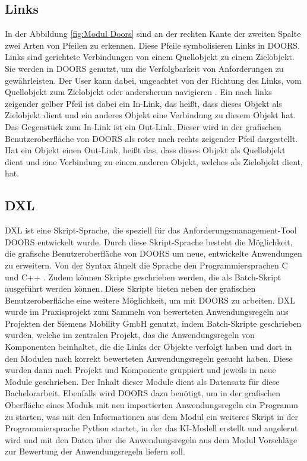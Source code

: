 \subsection{Links}
In der Abbildung \ref*{fig:Modul Doors} sind an der rechten Kante der zweiten Spalte zwei Arten von Pfeilen zu erkennen. Diese Pfeile
symbolisieren Links in \ac{DOORS}. Links sind gerichtete Verbindungen von einem Quellobjekt zu einem Zielobjekt. Sie werden in \ac{DOORS} 
genutzt, um die Verfolgbarkeit von Anforderungen zu gewährleisten. Der User kann 
dabei, ungeachtet von der Richtung des Links, vom Quellobjekt zum Zielobjekt oder andersherum navigieren \cite[vgl. S.183]{DOORS}. 
Ein nach links zeigender gelber Pfeil ist dabei ein In-Link, das heißt, dass dieses Objekt als Zielobjekt dient und ein anderes Objekt 
eine Verbindung zu diesem Objekt hat. Das Gegenstück zum In-Link ist ein Out-Link. Dieser wird in der grafischen Benutzeroberfläche von 
\ac{DOORS} als roter nach rechts zeigender Pfeil dargestellt. Hat ein Objekt einen Out-Link, heißt das, dass dieses Objekt als Quellobjekt 
dient und eine Verbindung zu einem anderen Objekt, welches als Zielobjekt dient, hat.   

\subsection{DXL}

\ac{DXL} ist eine Skript-Sprache, die speziell für das Anforderungsmanagement-Tool \ac{DOORS} entwickelt wurde. Durch diese Skript-Sprache
besteht die Möglichkeit, die grafische Benutzeroberfläche von \ac{DOORS} um neue, entwickelte Anwendungen zu
erweitern. Von der Syntax ähnelt die Sprache den Programmiersprachen C und C++ \cite[vgl. S.1]{DXL}. Zudem können Skripte geschrieben werden,
die als Batch-Skript ausgeführt werden können. Diese Skripte bieten neben der grafischen Benutzeroberfläche eine weitere Möglichkeit, 
um mit \ac{DOORS} zu arbeiten. \ac{DXL} wurde im Praxisprojekt zum Sammeln von bewerteten Anwendungsregeln aus Projekten der Siemens Mobility GmbH 
genutzt, indem Batch-Skripte geschrieben wurden, welche im zentralen Projekt, das die Anwendungsregeln von Komponenten beinhaltet, die die Links der Objekte
verfolgt haben und dort in den Modulen nach korrekt bewerteten Anwendungsregeln gesucht haben. Diese wurden dann nach Projekt und Komponente gruppiert und 
jeweils in neue Module geschrieben. Der Inhalt dieser Module dient als Datensatz für diese Bachelorarbeit. Ebenfalls wird \ac{DOORS} dazu benötigt,
um in der grafischen Oberfläche eines Moduls mit neu importierten Anwendungsregeln ein Programm zu starten, was mit den Informationen aus dem Modul
ein weiteres Skript in der Programmiersprache Python startet, in der das KI-Modell erstellt und angelernt wird und mit den Daten über die Anwendungsregeln aus 
dem Modul Vorschläge zur Bewertung der Anwendungsregeln liefern soll.
